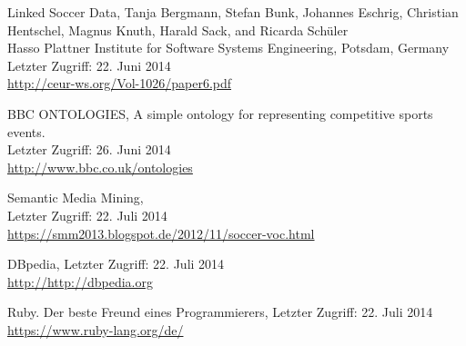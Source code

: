 \documentclass[runningheads,a4paper]{llncs}
\begin{document}
\begin{thebibliography}{4}

Linked Soccer Data,
Tanja Bergmann, Stefan Bunk, Johannes Eschrig, Christian Hentschel, Magnus Knuth, Harald Sack, and Ricarda Schüler\\
Hasso Plattner Institute for Software Systems Engineering, Potsdam, Germany\\
Letzter Zugriff: 22. Juni 2014\\
\url{http://ceur-ws.org/Vol-1026/paper6.pdf}

BBC ONTOLOGIES, A simple ontology for representing competitive sports events.\\
Letzter Zugriff: 26. Juni 2014\\
\url{http://www.bbc.co.uk/ontologies}

Semantic Media Mining,\\
Letzter Zugriff: 22. Juli 2014\\
\url{https://smm2013.blogspot.de/2012/11/soccer-voc.html}

DBpedia,
Letzter Zugriff: 22. Juli 2014\\
\url{http://http://dbpedia.org}

Ruby. Der beste Freund eines Programmierers,
Letzter Zugriff: 22. Juli 2014\\
\url{https://www.ruby-lang.org/de/}

\end{thebibliography}
\end{document}
